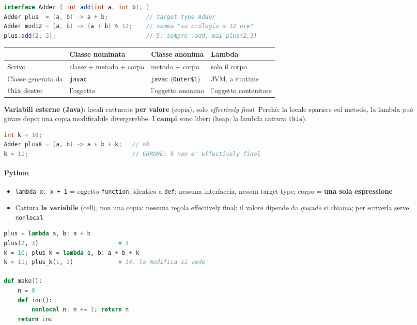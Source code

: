 \documentclass[12pt]{extarticle}
\begin{document}
\begin{lstlisting}[language=Java]
interface Adder { int add(int a, int b); }
Adder plus  = (a, b) -> a + b;           // target type Adder
Adder mod12 = (a, b) -> (a + b) % 12;    // somma "su orologio a 12 ore"
plus.add(2, 3);                          // 5: sempre .add, mai plus(2,3)
\end{lstlisting}

\begin{center}
\small
\begin{tabular}{p{3.2cm}p{3.6cm}p{3.8cm}p{3.8cm}}
    \toprule
    & \textbf{Classe nominata} & \textbf{Classe anonima} & \textbf{Lambda} \\
    \midrule
    Scrivo & classe + metodo + corpo & metodo + corpo & solo il corpo \\
    \addlinespace
    Classe generata da & \texttt{javac} & \texttt{javac} (\texttt{Outer\$1}) & JVM, a runtime \\
    \addlinespace
    \texttt{this} dentro & l'oggetto & l'oggetto anonimo & l'oggetto contenitore \\
    \bottomrule
\end{tabular}
\end{center}

\noindent \textbf{Variabili esterne (Java)}: locali catturate \textbf{per valore} (copia), solo \textit{effectively final}. Perché: la locale sparisce col metodo, la lambda può girare dopo; una copia modificabile divergerebbe. I \textbf{campi} sono liberi (heap, la lambda cattura \texttt{this}).
\begin{lstlisting}[language=Java]
int k = 10;
Adder plusK = (a, b) -> a + b + k;   // ok
k = 11;                              // ERRORE: k non e' effectively final
\end{lstlisting}

\paragraph{Python}
\begin{itemize}
    \item \texttt{lambda x: x + 1} = oggetto \texttt{function}, identico a \texttt{def}; nessuna interfaccia, nessun target type; corpo = \textbf{una sola espressione}
    \item Cattura \textbf{la variabile} (cell), non una copia: nessuna regola effectively final; il valore dipende da \emph{quando} si chiama; per scriverla serve \texttt{nonlocal}
\end{itemize}
\begin{lstlisting}[language=Python]
plus = lambda a, b: a + b
plus(2, 3)                       # 5
k = 10; plus_k = lambda a, b: a + b + k
k = 11; plus_k(1, 2)             # 14: la modifica si vede

def make():
    n = 0
    def inc():
        nonlocal n; n += 1; return n
    return inc
\end{lstlisting}
\end{document}
